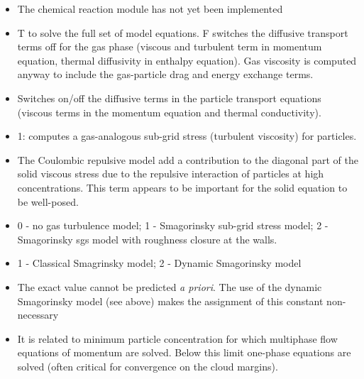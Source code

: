 \begin{itemize}

\item
{}
{The chemical reaction module has not yet been implemented}

\item
{}
{T to solve the full set of model equations. F switches the diffusive
transport terms off for the gas phase (viscous and turbulent term in momentum 
equation, thermal diffusivity in enthalpy equation). 
Gas viscosity is computed anyway to include the gas-particle drag and
energy exchange terms.}

\item
{}
{Switches on/off the diffusive terms in the particle transport equations 
(viscous terms in the momentum equation and thermal conductivity).}

\item
{}
{1: computes a gas-analogous sub-grid stress (turbulent viscosity)
for particles.}

\item
{}
{The Coulombic repulsive model add a contribution to the diagonal part of
the solid viscous stress due to the repulsive interaction of particles 
at high concentrations. This term appears to be important for the solid
equation to be well-posed.}

\item
{}
{0 - no gas turbulence model; 1 - Smagorinsky sub-grid stress model;
2 - Smagorinsky sgs model with roughness closure at the walls.}

\item
{}
{1 - Classical Smagrinsky model; 2 - Dynamic Smagorinsky model}

\item
{}
{The exact value cannot be predicted {\it a priori}. The use of the dynamic
Smagorinsky model (see above) makes the assignment of this constant
non-necessary}

\item
{}
{It is related to minimum particle concentration for which multiphase flow
equations of momentum are solved. Below this limit one-phase equations are solved
(often critical for convergence on the cloud margins).}


\end{itemize}
